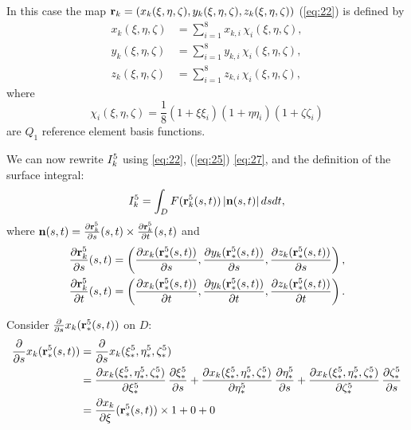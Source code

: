 \documentclass[11pt]{article}
\begin{document}
In this case the map $\mathbf{r}_{k} = \left( x_{k}(\xi,\eta,\zeta), y_{k}(\xi,\eta,\zeta), z_{k}(\xi,\eta,\zeta) \right)$ (\ref{eq:22}) is defined by
\begin{equation}
\label{eq:27}
\begin{aligned}
x_{k}(\xi,\eta,\zeta) &= \sum_{i=1}^{8} x_{k,i}\, \chi_{i}(\xi, \eta, \zeta),\\
y_{k}(\xi,\eta,\zeta) &= \sum_{i=1}^{8} y_{k,i}\, \chi_{i}(\xi, \eta, \zeta),\\
z_{k}(\xi,\eta,\zeta) &= \sum_{i=1}^{8} z_{k,i}\, \chi_{i}(\xi, \eta, \zeta),
\end{aligned}
\end{equation}
where
\begin{equation}
\label{eq:28}
\chi_{i}(\xi,\eta,\zeta) = \frac18 (1 + \xi\xi_{i})(1 + \eta\eta_{i})(1 + \zeta\zeta_{i})
\end{equation}
are $Q_{1}$ reference element basis functions.

We can now rewrite $I_{k}^{5}$ using \eqref{eq:22}, (\ref{eq:25}) \eqref{eq:27}, and the definition of the surface integral:
\begin{equation}
\label{eq:29}
I_{k}^{5} = \int_{D} F(\mathbf{r}_{k}^{5}(s,t))\, | \mathbf{n}(s,t) |\,dsdt,
\end{equation}
where $\mathbf{n}(s,t) = \frac{\partial \mathbf{r}_{k}^{5}}{\partial s}(s,t) \times \frac{\partial \mathbf{r}_{k}^{5}}{\partial t}(s,t)$ and
\begin{equation}
\label{eq:30}
\begin{aligned}
\frac{\partial \mathbf{r}_{k}^{5}}{\partial s}(s,t) &= \left(\frac{\partial x_{k}(\mathbf{r}_{*}^{5}(s,t))}{\partial s}, \frac{\partial y_{k}(\mathbf{r}_{*}^{5}(s,t))}{\partial s}, \frac{\partial z_{k}(\mathbf{r}_{*}^{5}(s,t))}{\partial s}\right),\\
\frac{\partial \mathbf{r}_{k}^{5}}{\partial t}(s,t) &= \left(\frac{\partial x_{k}(\mathbf{r}_{*}^{5}(s,t))}{\partial t}, \frac{\partial y_{k}(\mathbf{r}_{*}^{5}(s,t))}{\partial t}, \frac{\partial z_{k}(\mathbf{r}_{*}^{5}(s,t))}{\partial t}\right).
\end{aligned}
\end{equation}

Consider $\frac{\partial }{\partial s}x_{k}(\mathbf{r}_{*}^{5}(s,t))$ on $D$:
\newcommand{\xFr}{x_k(\Fr{\xi}, \Fr{\eta}, \Fr{\zeta})}
\begin{equation}
  \label{eq:31}
  \begin{aligned}
    \diff{}{s}x_{k}(\Fr{\R}(s,t)) &= \diff{}{s}\xFr\\
    &=\diff{\xFr}{\Fr{\xi}}\,\diff{\Fr{\xi}}{s}
    +\diff{\xFr}{\Fr{\eta}}\,\diff{\Fr{\eta}}{s}
    +\diff{\xFr}{\Fr{\zeta}}\,\diff{\Fr{\zeta}}{s}\\
    &=\diff{x_{k}}{\xi}(\Fr{\R}(s,t)) \times 1 + 0 + 0
  \end{aligned}
\end{equation}
\end{document}
